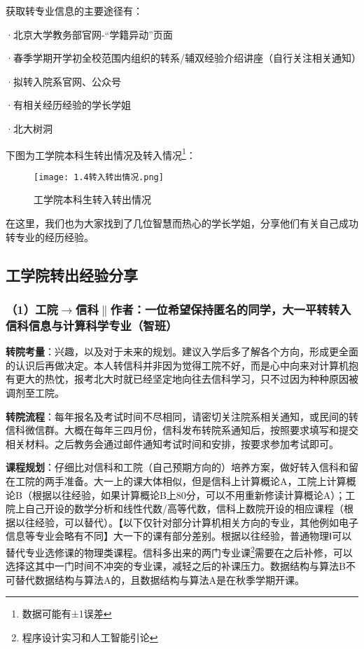\documentclass[11pt,oneside]{book}
\begin{document}
\vspace{20pt}

获取转专业信息的主要途径有：

·北京大学教务部官网-“学籍异动”页面

·春季学期开学初全校范围内组织的转系/辅双经验介绍讲座（自行关注相关通知）

·拟转入院系官网、公众号

·有相关经历经验的学长学姐

·北大树洞


下图为工学院本科生转出情况及转入情况\footnote{数据可能有±1误差}：
\begin{figure}[htbp]
    \centering
    \texttt{[image: 1.4转入转出情况.png]}
    \renewcommand{\figurename}{图}
    \caption{工学院本科生转入转出情况}
    \label{fig:enter-label}
\end{figure}

在这里，我们也为大家找到了几位智慧而热心的学长学姐，分享他们有关自己成功转专业的经历经验。

\subsection{工学院转出经验分享}
\subsubsection{（1）工院$\to$信科$\parallel$作者：一位希望保持匿名的同学，大一平转转入信科信息与计算科学专业（智班）}
\textbf{转院考量}：兴趣，以及对于未来的规划。建议入学后多了解各个方向，形成更全面的认识后再做决定。本人转信科并非因为觉得工院不好，而是心中向来对计算机抱有更大的热忱，报考北大时就已经坚定地向往去信科学习，只不过因为种种原因被调剂至工院。

\vspace{10pt}

\textbf{转院流程}：每年报名及考试时间不尽相同，请密切关注院系相关通知，或民间的转信科微信群。大概在每年三四月份，信科发布转院系通知后，按照要求填写和提交相关材料。之后教务会通过邮件通知考试时间和安排，按要求参加考试即可。

\vspace{10pt}

\textbf{课程规划}：仔细比对信科和工院（自己预期方向的）培养方案，做好转入信科和留在工院的两手准备。大一上的课大体相似，但是信科上计算概论A，工院上计算概论B（根据以往经验，如果计算概论B上80分，可以不用重新修读计算概论A）；工院上自己开设的数学分析和线性代数/高等代数，信科上数院开设的相应课程（根据以往经验，可以替代）。【以下仅针对部分计算机相关方向的专业，其他例如电子信息等专业会略有不同】大一下的课有部分差别。根据以往经验，普通物理Ⅰ可以替代专业选修课的物理类课程。信科多出来的两门专业课\footnote{程序设计实习和人工智能引论}需要在之后补修，可以选择这其中一门时间不冲突的专业课，减轻之后的补课压力。数据结构与算法B不可替代数据结构与算法A的，且数据结构与算法A是在秋季学期开课。
\end{document}
